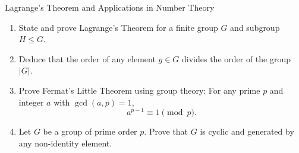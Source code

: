 \begin{exercise}{Lagrange's Theorem and Applications in Number Theory}
\begin{enumerate}[leftmargin=1.5em,itemsep=2pt]
  \item State and prove Lagrange's Theorem for a finite group $G$ and subgroup $H \le G$.
  \item Deduce that the order of any element $g \in G$ divides the order of the group $|G|$.
  \item Prove Fermat's Little Theorem using group theory: For any prime $p$ and integer $a$ with $\gcd(a, p) = 1$,
  \[
  a^{p-1} \equiv 1 \pmod p.
  \]
  \item Let $G$ be a group of prime order $p$. Prove that $G$ is cyclic and generated by any non-identity element.
\end{enumerate}
\end{exercise}

\begin{tabletworkspace}[5.5cm]
\end{tabletworkspace}

